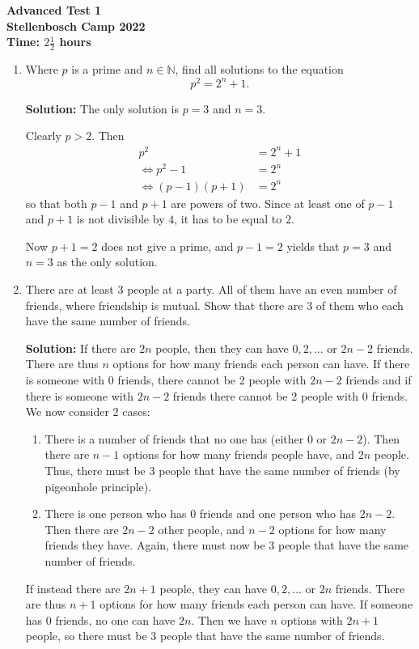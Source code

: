 \documentclass{article}
\begin{document}
\thispagestyle{empty}

\begin{center}
  \textbf{\Large Advanced Test 1}
  \\ \vspace{1em}
  \textbf{\large Stellenbosch Camp 2022}
  \\ \vspace{1em}
  \textbf{\large Time: $2\frac{1}{2}$ hours}
\end{center}

\bigskip

\begin{enumerate}[itemsep=24pt]
\item %
Where $p$ is a prime and $n\in\mathbb{N}$, find all solutions to the equation \[p^2 = 2^n + 1.\]

\textbf{Solution:} The only solution is $p = 3$ and $n = 3$.

Clearly $p>2$. Then 
\begin{align*}
	p^2 &= 2^n + 1
	\\ \iff p^2-1 &= 2^n
	\\ \iff (p-1)(p+1) &= 2^n
\end{align*}
so that both $p-1$ and $p+1$ are powers of two. Since at least one of $p-1$ and $p+1$ is not divisible by $4$, it has to be equal to $2$.

Now $p+1 = 2$ does not give a prime, and $p-1 = 2$ yields that $p =3$ and $n=3$ as the only solution.


\item %
There are at least 3 people at a party. All of them have an even number of friends, where friendship is mutual. Show that there are 3 of them who each have the same number of friends.

\textbf{Solution:} If there are $2n$ people, then they can have $0,2,...$ or $2n-2$ friends. There are thus $n$ options for how many friends each person can have. If there is someone with 0 friends, there cannot be 2 people with $2n-2$ friends and if there is someone with $2n-2$ friends there cannot be 2 people with 0 friends. We now consider 2 cases:
\begin{enumerate}
\item There is a number of friends that no one has (either 0 or $2n-2$). Then there are $n-1$ options for how many friends people have, and $2n$ people. Thus, there must be 3 people that have the same number of friends (by pigeonhole principle).
\item There is one person who has 0 friends and one person who has $2n-2$. Then there are $2n-2$ other people, and $n-2$ options for how many friends they have. Again, there must now be 3 people that have the same number of friends.
\end{enumerate}
If instead there are $2n+1$ people, they can have $0,2,...$ or $2n$ friends. There are thus $n+1$ options for how many friends each person can have. If someone has 0 friends, no one can have $2n$. Then we have $n$ options with $2n+1$ people, so there must be 3 people that have the same number of friends.



\end{enumerate}
\end{document}
